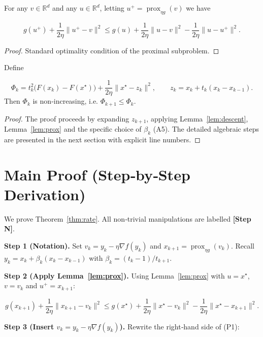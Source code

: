 \documentclass{article}
\begin{document}
\begin{lemma}\label{lem:prox}
For any $v\in\mathbb R^{d}$ and any $u\in\mathbb R^{d}$, letting
$u^{+}= \operatorname{prox}_{\eta g}(v)$ we have  

\[
g(u^{+})+ \frac{1}{2\eta}\|u^{+}-v\|^{2}\le
g(u)+\frac{1}{2\eta}\|u-v\|^{2}
-\frac{1}{2\eta}\|u-u^{+}\|^{2}.
\tag{L2}
\]
\end{lemma}
\begin{proof}
Standard optimality condition of the proximal subproblem.
\end{proof}

\begin{lemma}\label{lem:potential}
Define  

\[
\Phi_{k}=t_{k}^{2}\bigl(F(x_{k})-F(x^{\star})\bigr)+\frac{1}{2\eta}\|x^{\star}-z_{k}\|^{2},
\qquad 
z_{k}=x_{k}+t_{k}(x_{k}-x_{k-1}).
\tag{L3}
\]
Then $\Phi_{k}$ is non‑increasing, i.e. $\Phi_{k+1}\le\Phi_{k}$.
\end{lemma}
\begin{proof}
The proof proceeds by expanding $z_{k+1}$, applying Lemma~\ref{lem:descent},
Lemma~\ref{lem:prox} and the specific choice of $\beta_{k}$ (A5).  
The detailed algebraic steps are presented in the next section with explicit
line numbers.
\end{proof}

\section*{Main Proof (Step‑by‑Step Derivation)}
We prove Theorem~\ref{thm:rate}.  
All non‑trivial manipulations are labelled \textbf{[Step N]}.

\bigskip
\noindent\textbf{Step 1 (Notation).}  
Set $v_{k}=y_{k}-\eta\nabla f(y_{k})$ and $x_{k+1}= \operatorname{prox}_{\eta g}(v_{k})$.
Recall $y_{k}=x_{k}+ \beta_{k}(x_{k}-x_{k-1})$ with $\beta_{k}= (t_{k}-1)/t_{k+1}$.

\bigskip
\noindent\textbf{Step 2 (Apply Lemma~\ref{lem:prox}).}  
Using Lemma~\ref{lem:prox} with $u=x^{\star}$, $v=v_{k}$ and $u^{+}=x_{k+1}$:

\[
g(x_{k+1})+\frac{1}{2\eta}\|x_{k+1}-v_{k}\|^{2}
\le g(x^{\star})+\frac{1}{2\eta}\|x^{\star}-v_{k}\|^{2}
-\frac{1}{2\eta}\|x^{\star}-x_{k+1}\|^{2}.
\tag{P1}
\]

\bigskip
\noindent\textbf{Step 3 (Insert $v_{k}=y_{k}-\eta\nabla f(y_{k})$).}  
Rewrite the right‑hand side of (P1):
\end{document}
